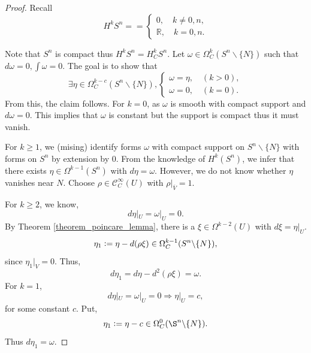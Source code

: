 \documentclass[8pt]{article}
\newcommand{\defeq}{\vcentcolon=}
\newcommand{\R}[0]{\mathbb{R}}
\newcommand{\cinf}[0]{\mathcal{C}^\infty}
\begin{document}
\begin{proof}
  Recall 
  \begin{equation*}
    H^k S^n==\begin{cases}
      0,\quad k\not=0,n,\\
      \R,\quad k=0,n.
    \end{cases}
  \end{equation*}
  \begin{center}
  \end{center}
  Note that $S^n$ is compact thus $H^kS^n=H^k_CS^n$. Let $\omega\in\Omega_C^k(S^n\backslash\{N\})$ such that $d\omega=0,\int\omega=0$. The goal is to show that 
  \begin{equation*}
    \exists \eta\in\Omega^{k-c}_C(S^n\backslash\{N\}),\begin{cases}
      \omega = \eta,\quad (k>0),\\
      \omega = 0,\quad (k=0).
    \end{cases}
  \end{equation*}
  From this, the claim follows. For $k=0$, as $\omega$ is smooth with compact support and $d\omega = 0$. This implies that $\omega$ is constant but the support is compact thus it must vanish.
  \par For $k\geq1$, we (mising) identify forms $\omega$ with compact support on $S^n\backslash\{N\}$ with forms on $S^n$ by extension by $0$. From the knowledge of $H^k(S^n)$, we infer that there exists $\eta\in\Omega^{k-1}(S^n)$ with $d\eta=\omega$. However, we do not know whether $\eta$ vanishes near $N$.
  Choose $\rho\in\cinf_C(U)$ with $\rho|_{\overline{V}}=1$.
  \par For $k\geq 2$, we know,\
  \begin{equation*}
    d\eta|_U=\omega|_U=0.
  \end{equation*}
  By Theorem \ref{theorem_poincare_lemma}, there is a $\xi\in\Omega^{k-2}(U)$ with $d\xi=\eta|_U$.
  \begin{equation*}
    \eta_1\defeq \eta-d(\rho\xi)\in\Omega_C^{k-1}(S^n\backslash\{N\}),
  \end{equation*}
  since $\eta_1|_V=0$. Thus,
  \begin{equation*}
    d\eta_1=d\eta-d^2(\rho\xi)=\omega.
  \end{equation*}
  For $k=1$, 
  \begin{equation*}
    d\eta|_U=\omega|_U=0\Rightarrow\eta|_U=c,
  \end{equation*}
  for some constant $c$. Put,
  \begin{equation*}
    \eta_1\defeq \eta-c\in\Omega^0_C(\S^n\backslash\{N\}).
  \end{equation*}
  Thus $d\eta_1=\omega$.
\end{proof}
\end{document}
